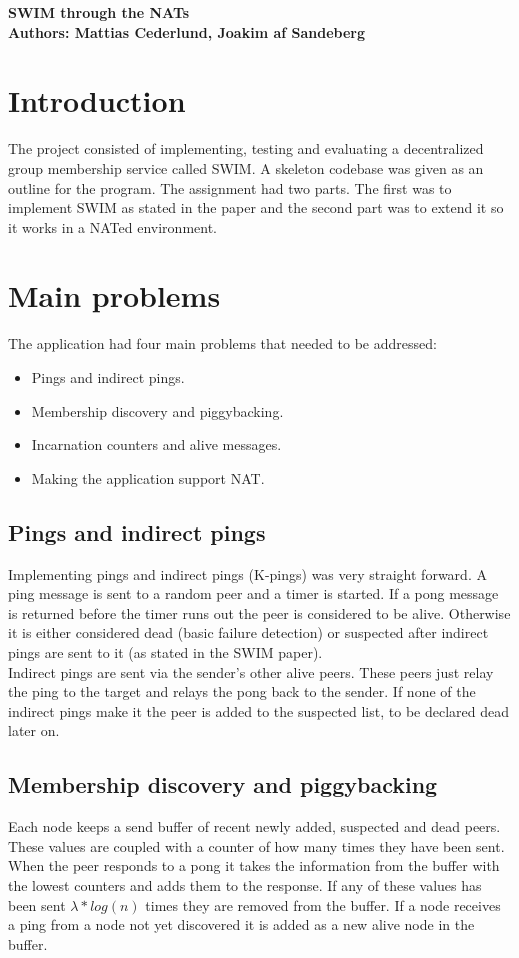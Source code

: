 \documentclass[10pt]{proc}
\begin{document}
\large{\textbf{SWIM through the NATs}}\\

\large{\textbf{Authors: Mattias Cederlund, Joakim af Sandeberg}}

\section{Introduction}
The project consisted of implementing, testing and evaluating a decentralized group membership service called SWIM. A skeleton codebase was given as an outline for the program. The assignment had two parts. The first was to implement SWIM as stated in the paper  and the second part was to extend it so it works in a NATed environment. 
\section{Main problems}
The application had four main problems that needed to be addressed:
\begin{itemize}
\item Pings and indirect pings.
\item Membership discovery and piggybacking.
\item Incarnation counters and alive messages.
\item Making the application support NAT.
\end{itemize}

\subsection{Pings and indirect pings}
Implementing pings and indirect pings (K-pings) was very straight forward. A ping message is sent to a random peer and a timer is started. If a pong message is returned before the timer runs out the peer is considered to be alive. Otherwise it is either considered dead (basic failure detection) or suspected after indirect pings are sent to it (as stated in the SWIM paper). 
\\[10pt]
Indirect pings are sent via the sender's other alive peers. These peers just relay the ping to the target and relays the pong back to the sender. If none of the indirect pings make it the peer is added to the suspected list, to be declared dead later on.
\subsection{Membership discovery and piggybacking}
Each node keeps a send buffer of recent newly added, suspected and dead peers. These values are coupled with a counter of how many times they have been sent. When the peer responds to a pong it takes the information from the buffer with the lowest counters and adds them to the response. If any of these values has been sent \(\lambda *log(n)\) times they are removed from the buffer. If a node receives a ping from a node not yet discovered it is added as a new alive node in the buffer.
\end{document}

